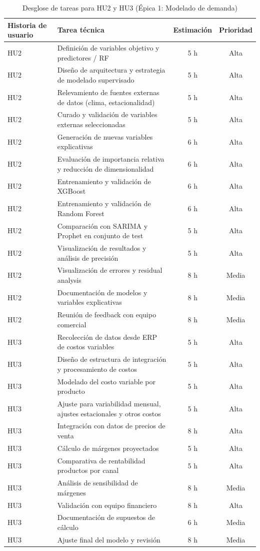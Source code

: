 \documentclass[
11pt, %
]{charter}
\begin{document}
\begin{table}[H]
\centering
\begin{tabular}{|l|p{6cm}|c|c|}
\hline
\textbf{Historia de usuario} & \textbf{Tarea técnica} & \textbf{Estimación} & \textbf{Prioridad} \\
\hline
HU2 & Definición de variables objetivo y predictores / RF & 5 h & Alta \\
HU2 & Diseño de arquitectura y estrategia de modelado supervisado & 5 h & Alta \\
HU2 & Relevamiento de fuentes externas de datos (clima, estacionalidad) & 5 h & Alta \\
HU2 & Curado y validación de variables externas seleccionadas & 5 h & Alta \\
HU2 & Generación de nuevas variables explicativas & 6 h & Alta \\
HU2 & Evaluación de importancia relativa y reducción de dimensionalidad & 6 h & Alta \\
HU2 & Entrenamiento y validación de XGBoost & 6 h & Alta \\
HU2 & Entrenamiento y validación de Random Forest & 6 h & Alta \\
HU2 & Comparación con SARIMA y Prophet en conjunto de test & 5 h & Alta \\
HU2 & Visualización de resultados y análisis de precisión & 5 h & Alta \\
HU2 & Visualización de errores y residual analysis & 8 h & Media \\
HU2 & Documentación de modelos y variables explicativas & 8 h & Media \\
HU2 & Reunión de feedback con equipo comercial & 8 h & Media \\
\hline
HU3 & Recolección de datos desde ERP de costos variables & 5 h & Alta \\
HU3 & Diseño de estructura de integración y procesamiento de costos & 5 h & Alta \\
HU3 & Modelado del costo variable por producto & 5 h & Alta \\
HU3 & Ajuste para variabilidad mensual, ajustes estacionales y otros costos & 5 h & Alta \\
HU3 & Integración con datos de precios de venta & 8 h & Alta \\
HU3 & Cálculo de márgenes proyectados & 5 h & Alta \\
HU3 & Comparativa de rentabilidad productos por canal & 5 h & Alta \\
HU3 & Análisis de sensibilidad de márgenes & 8 h & Media \\
HU3 & Validación con equipo financiero & 8 h & Alta \\
HU3 & Documentación de supuestos de cálculo & 6 h & Media \\
HU3 & Ajuste final del modelo y revisión & 8 h & Media \\
\hline
\end{tabular}
\caption{Desglose de tareas para HU2 y HU3 (Épica 1: Modelado de demanda)}
\end{table}
\end{document}
